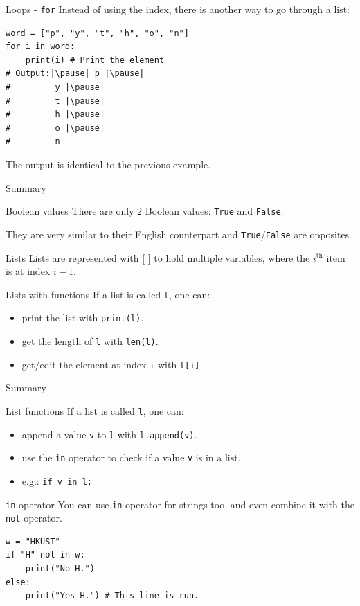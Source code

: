 \documentclass[dvipsnames, svgnames, x11names, handout]{beamer}
\begin{document}
\begin{frame}[fragile]{Loops - \texttt{for}}
Instead of using the index, there is another way to go through a list:
\begin{verbatim}
word = ["p", "y", "t", "h", "o", "n"]
for i in word:
    print(i) # Print the element
# Output:|\pause| p |\pause|
#         y |\pause|
#         t |\pause|
#         h |\pause|
#         o |\pause|
#         n
\end{verbatim}
\pause The output is identical to the previous example.
\end{frame}

\begin{frame}[fragile]{Summary}
\begin{block}{Boolean values}
There are only 2 Boolean values: \texttt{True} and \texttt{False}.

They are very similar to their English counterpart and \texttt{True}/\texttt{False} are opposites.
\end{block}
\begin{block}{Lists}
Lists are represented with [ ] to hold multiple variables, where the $i^{\text{th}}$ item is at index $i - 1$.\\
\end{block}
\begin{block}{Lists with functions}
If a list is called \texttt{l}, one can:
\begin{itemize}
    \item print the list with \texttt{print(l)}.
    \item get the length of \texttt{l} with \texttt{len(l)}.
    \item get/edit the element at index \texttt{i} with \texttt{l[i]}.
\end{itemize}
\end{block}
\end{frame}

\begin{frame}[fragile]{Summary}
\begin{block}{List functions}
If a list is called \texttt{l}, one can:
\begin{itemize}
    \item append a value \texttt{v} to \texttt{l} with \texttt{l.append(v)}.
    \item use the \texttt{in} operator to check if a value \texttt{v} is in a list.
    \item[] e.g.: \texttt{if v in l:}
\end{itemize}
\end{block}

\begin{block}{\texttt{in} operator}
You can use \texttt{in} operator for strings too, and even combine it with the \texttt{not} operator.
\begin{verbatim}
w = "HKUST"
if "H" not in w:
    print("No H.")
else:
    print("Yes H.") # This line is run.
\end{verbatim}
\end{block}
\end{frame}
\end{document}
